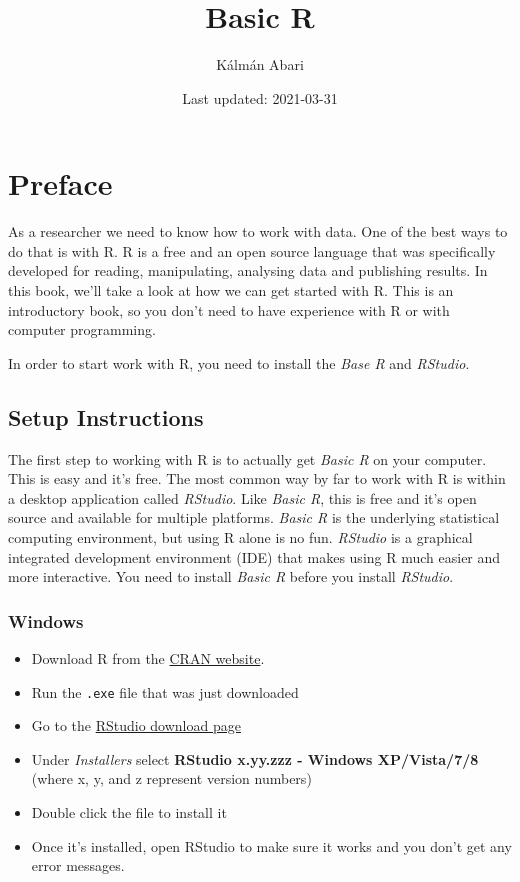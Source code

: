 \documentclass[
]{book}
\title{Basic R}
\author{Kálmán Abari}
\date{Last updated: 2021-03-31}
\providecommand{\tightlist}{%
  \setlength{\itemsep}{0pt}\setlength{\parskip}{0pt}}
\begin{document}
\maketitle

{
\setcounter{tocdepth}{1}
\tableofcontents
}
\hypertarget{preface}{%
\chapter*{Preface}\label{preface}}

As a researcher we need to know how to work with data. One of the best ways to do that is with R. R is a free and an open source language that was specifically developed for reading, manipulating, analysing data and publishing results. In this book, we'll take a look at how we can get started with R. This is an introductory book, so you don't need to have experience with R or with computer programming.

In order to start work with R, you need to install the \emph{Base R} and \emph{RStudio}.

\hypertarget{setup-instructions}{%
\section*{Setup Instructions}\label{setup-instructions}}

The first step to working with R is to actually get \emph{Basic R} on your computer. This is easy and it's free. The most common way by far to work with R is within a desktop application called \emph{RStudio}. Like \emph{Basic R}, this is free and it's open source and available for multiple platforms. \emph{Basic R} is the underlying statistical computing environment, but using R alone is no
fun. \emph{RStudio} is a graphical integrated development environment (IDE) that makes
using R much easier and more interactive. You need to install \emph{Basic R} before you
install \emph{RStudio}.

\hypertarget{windows}{%
\subsection*{Windows}\label{windows}}

\begin{itemize}
\tightlist
\item
  Download R from
  the \href{http://cran.r-project.org/bin/windows/base/release.htm}{CRAN website}.
\item
  Run the \texttt{.exe} file that was just downloaded
\item
  Go to the \href{https://www.rstudio.com/products/rstudio/download/\#download}{RStudio download page}
\item
  Under \emph{Installers} select \textbf{RStudio x.yy.zzz - Windows
  XP/Vista/7/8} (where x, y, and z represent version numbers)
\item
  Double click the file to install it
\item
  Once it's installed, open RStudio to make sure it works and you don't get any
  error messages.
\end{itemize}
\end{document}
